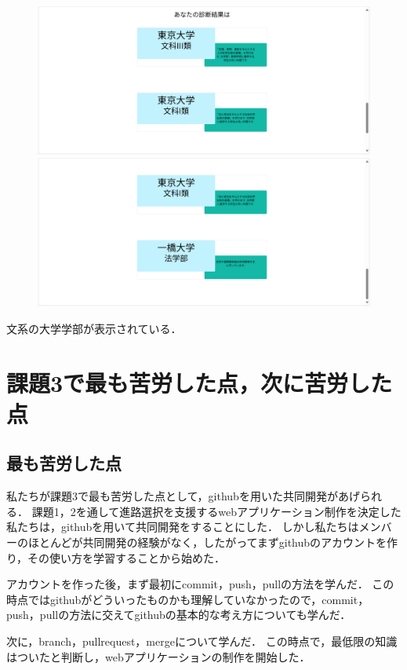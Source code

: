 \documentclass[a4j, titlepage]{jarticle}
\begin{document}
\begin{figure}[htbp]
  \centering
\includegraphics[scale=0.15]{dousakekka-12.png}
\includegraphics[scale=0.15]{dousakekka-13.png}
\end{figure}

文系の大学学部が表示されている．

\section{課題3で最も苦労した点，次に苦労した点}
\subsection{最も苦労した点}

私たちが課題3で最も苦労した点として，githubを用いた共同開発があげられる．
課題1，2を通して進路選択を支援するwebアプリケーション制作を決定した私たちは，githubを用いて共同開発をすることにした．
しかし私たちはメンバーのほとんどが共同開発の経験がなく，したがってまずgithubのアカウントを作り，その使い方を学習することから始めた．

アカウントを作った後，まず最初にcommit，push，pullの方法を学んだ．
この時点ではgithubがどういったものかも理解していなかったので，commit，push，pullの方法に交えてgithubの基本的な考え方についても学んだ．

次に，branch，pullrequest，mergeについて学んだ．
この時点で，最低限の知識はついたと判断し，webアプリケーションの制作を開始した．
\end{document}
